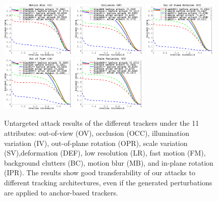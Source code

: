 \documentclass[12pt]{article}
\begin{document}
\begin{figure}[t!]
\begin{center}
    \includegraphics[width=0.32\textwidth]{images_imperceptible/OTB2015/success_plot_OPE_OTB100_MB.png}
    \includegraphics[width=0.32\textwidth]{images_imperceptible/OTB2015/success_plot_OPE_OTB100_OCC.png}
    \includegraphics[width=0.32\textwidth]{images_imperceptible/OTB2015/success_plot_OPE_OTB100_OPR.png}
    \includegraphics[width=0.32\textwidth]{images_imperceptible/OTB2015/success_plot_OPE_OTB100_OV.png}
    \includegraphics[width=0.32\textwidth]{images_imperceptible/OTB2015/success_plot_OPE_OTB100_SV.png}
  \end{center}
      \caption{Untargeted attack results of the different trackers under the 11 attributes: out-of-view (OV), occlusion (OCC), illumination variation (IV), out-of-plane rotation (OPR), scale variation (SV),deformation (DEF), low resolution (LR), fast motion (FM), background clutters (BC), motion blur (MB), and in-plane rotation (IPR). The results show good transferability of our attacks to different tracking architectures, even if the generated perturbations are applied to anchor-based trackers.}
  \label{fig:attr}
\end{figure}
\end{document}
